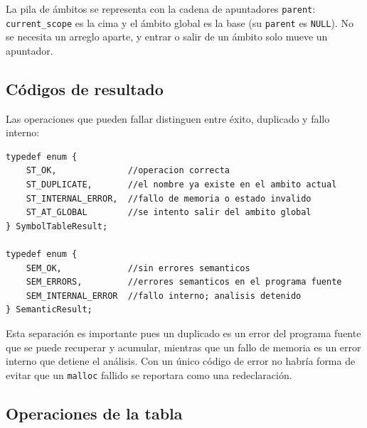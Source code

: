 \documentclass[12pt,letterpaper]{article}
\begin{document}
\bigskip

La pila de ámbitos se representa con la cadena de apuntadores \texttt{parent}: \texttt{current\_scope} es la
cima y el ámbito global es la base (su \texttt{parent} es \texttt{NULL}). No se necesita un arreglo aparte, y
entrar o salir de un ámbito solo mueve un apuntador.

\subsection*{Códigos de resultado}

Las operaciones que pueden fallar distinguen entre éxito, duplicado y fallo interno:

\begin{lstlisting}[style=modernc, caption={Códigos de resultado de la tabla y del analizador.}]
typedef enum {
    ST_OK,              //operacion correcta
    ST_DUPLICATE,       //el nombre ya existe en el ambito actual
    ST_INTERNAL_ERROR,  //fallo de memoria o estado invalido
    ST_AT_GLOBAL        //se intento salir del ambito global
} SymbolTableResult;

typedef enum {
    SEM_OK,             //sin errores semanticos
    SEM_ERRORS,         //errores semanticos en el programa fuente
    SEM_INTERNAL_ERROR  //fallo interno; analisis detenido
} SemanticResult;
\end{lstlisting}

\bigskip

Esta separación es importante pues un duplicado es un error del programa fuente que se puede recuperar y
acumular, mientras que un fallo de memoria es un error interno que detiene el análisis. Con un único código de
error no habría forma de evitar que un \texttt{malloc} fallido se reportara como una redeclaración.

\subsection*{Operaciones de la tabla}
\end{document}

